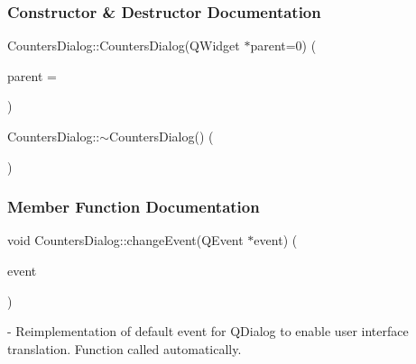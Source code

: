 \subsubsection{Constructor \& Destructor Documentation}
{\setlength{\rightskip}{0pt plus 5cm}Counters\+Dialog\+::{\texorpdfstring{Counters\+Dialog(\+Q\+Widget $\ast$parent=0)}{CountersDialog(QWidget *parent=0)}} (
\begin{DoxyParamCaption}
\item[{Q\+Widget $\ast$}]{parent = {}}
\end{DoxyParamCaption}
)\hspace{0.3cm}{\ttfamily [explicit]}}\hypertarget{classCountersDialog_a92f8263f1080effc36182051fdd06b72}{}\label{classCountersDialog_a92f8263f1080effc36182051fdd06b72}


{\setlength{\rightskip}{0pt plus 5cm}Counters\+Dialog\+::{\texorpdfstring{$\sim$\+Counters\+Dialog()}{~CountersDialog()}} (
\begin{DoxyParamCaption}
{}
\end{DoxyParamCaption}
)}\hypertarget{classCountersDialog_ab32b098f7b560b2fa550f51e0bba5863}{}\label{classCountersDialog_ab32b098f7b560b2fa550f51e0bba5863}


\subsubsection{Member Function Documentation}
{\setlength{\rightskip}{0pt plus 5cm}void Counters\+Dialog\+::{\texorpdfstring{change\+Event(\+Q\+Event $\ast$event)}{changeEvent(QEvent *event)}} (
\begin{DoxyParamCaption}
\item[{Q\+Event $\ast$}]{event}
\end{DoxyParamCaption}
)\hspace{0.3cm}{\ttfamily [protected]}} - Reimplementation of default event for QDialog to enable user interface translation. Function called automatically.

